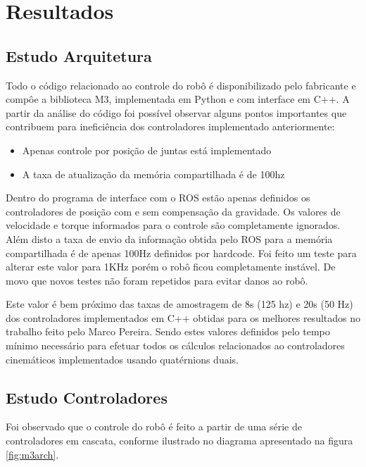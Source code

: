 \chapter{Resultados\label{chap:FundamentacaoMatematica}}


\section{Estudo Arquitetura}

Todo o código relacionado ao controle do robô é disponibilizado pelo fabricante e compôe a biblioteca M3, implementada em Python e com interface em C++. A partir da análise do código foi possível observar alguns pontos importantes que contribuem para ineficiência dos controladores implementado anteriormente:

\begin{itemize}
    \item Apenas controle por posição de juntas está implementado
    \item A taxa de atualização da memória compartilhada é de 100hz
\end{itemize}

Dentro do programa de interface com o ROS estão apenas definidos os controladores de posição com e sem compensação da gravidade. Os valores de velocidade e torque informados para o controle são completamente ignorados. Além disto a taxa de envio da informação obtida pelo ROS para a memória compartilhada é de apenas 100Hz definidos por hardcode. Foi feito um teste para alterar este valor para 1KHz porém o robô ficou completamente instável. De movo que novos testes não foram repetidos para evitar danos ao robô.

Este valor é bem próximo das taxas de amostragem de 8s (125 hz) e 20s (50 Hz) dos controladores implementados em C++ obtidas para os melhores resultados no trabalho feito pelo Marco Pereira. Sendo estes valores definidos pelo tempo mínimo necessário para efetuar todos os cálculos relacionados ao controladores cinemáticos implementados usando quatérnions duais.

\section{Estudo Controladores}

Foi observado que o controle do robô é feito a partir de uma série de controladores em cascata, conforme ilustrado no diagrama apresentado na figura \ref{fig:m3arch}.

